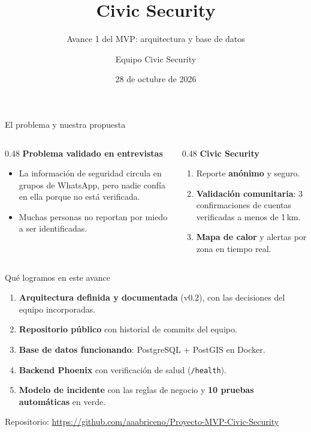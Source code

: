 \documentclass[aspectratio=169,10pt]{beamer}
\title[Civic Security]{Civic Security}
\subtitle{Avance 1 del MVP: arquitectura y base de datos}
\author[Equipo Civic Security]{Equipo Civic Security}
\institute[UCSP]{ET201 -- Formación de Empresas de Base Tecnológica I \\ Universidad Católica San Pablo}
\date[28/10/2026]{28 de octubre de 2026}
\begin{document}
\begin{frame}
  \titlepage
\end{frame}

\begin{frame}{El problema y nuestra propuesta}
  \begin{columns}[T]
    \begin{column}{0.48\textwidth}
      \textbf{Problema validado en entrevistas}
      \begin{itemize}
        \item La información de seguridad circula en grupos de WhatsApp, pero \alert{nadie confía en ella} porque no está verificada.
        \item Muchas personas \alert{no reportan por miedo} a ser identificadas.
      \end{itemize}
    \end{column}
    \begin{column}{0.48\textwidth}
      \textbf{Civic Security}
      \begin{enumerate}
        \item Reporte \textbf{anónimo} y seguro.
        \item \textbf{Validación comunitaria}: 3 confirmaciones de cuentas verificadas a menos de 1\,km.
        \item \textbf{Mapa de calor} y alertas por zona en tiempo real.
      \end{enumerate}
    \end{column}
  \end{columns}
\end{frame}

\begin{frame}{Qué logramos en este avance}
  \begin{enumerate}
    \item \textbf{Arquitectura definida y documentada} (v0.2), con las decisiones del equipo incorporadas.
    \item \textbf{Repositorio público} con historial de commits del equipo.
    \item \textbf{Base de datos funcionando}: PostgreSQL + PostGIS en Docker.
    \item \textbf{Backend Phoenix} con verificación de salud (\texttt{/health}).
    \item \textbf{Modelo de incidente} con las reglas de negocio y \textbf{10 pruebas automáticas} en verde.
  \end{enumerate}
  \vfill
  \small Repositorio: \url{https://github.com/aaabriceno/Proyecto-MVP-Civic-Security}
\end{frame}
\end{document}
